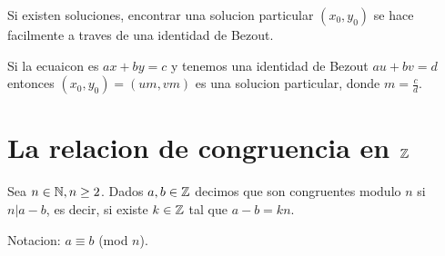 \begin{remark}
	Si existen soluciones, encontrar una solucion particular \((x_0, y_0 )\) se hace facilmente a traves de una identidad de Bezout.
	
	Si la ecuaicon es \(ax + by = c \) y tenemos una identidad de Bezout \(au + bv = d \) entonces \((x_0, y_0 ) = (um, vm )\) es una solucion particular, donde \(m = \frac{c}{d }\).
\end{remark}

\section{La relacion de congruencia en \(\mathbb{Z} \)}

\begin{definition}
	Sea \(n \in \mathbb{N}, n \geq 2 \). Dados \(a,b \in \mathbb{Z} \) decimos que son congruentes modulo \(n \) si \(n|a-b \), es decir, si existe \(k \in \mathbb{Z} \) tal que \(a - b = kn \).
	
	Notacion: \(a \equiv b \) (mod \(n \)).
\end{definition}

